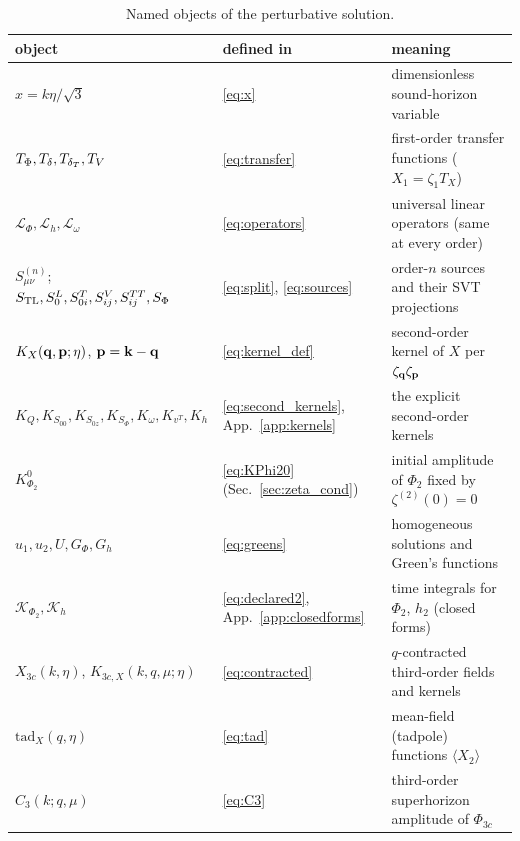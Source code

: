 \begin{table}[t]
\centering\small
\begin{tabular}{@{}p{}p{}p{}@{}}
\hline
object & defined in & meaning\\ \hline
$x=k\eta/\sqrt3$ & \eqref{eq:x} & dimensionless sound-horizon variable\\
$T_\Phi,T_\delta,T_{\delta_T},T_V$ & \eqref{eq:transfer} & first-order transfer functions ($X_1=\zeta_1T_X$)\\
$\mathcal L_\Phi,\mathcal L_h,\mathcal L_\omega$ & \eqref{eq:operators} & universal linear operators (same at every order)\\
$S^{(n)}_{\mu\nu}$; $S_{\rm TL},S_{0}^{L},S^{T}_{0i},S^{V}_{ij},S^{TT}_{ij},S_\Phi$ & \eqref{eq:split}, \eqref{eq:sources} & order-$n$ sources and their SVT projections\\
$K_X(\mathbf q,\mathbf p;\eta)$, $\mathbf p=\mathbf k-\mathbf q$ & \eqref{eq:kernel_def} & second-order kernel of $X$ per $\zeta_{\mathbf q}\zeta_{\mathbf p}$\\
$K_Q,K_{S_{00}},K_{S_{0z}},K_{S_\Phi},K_\omega,K_{v^T},K_h$ & \eqref{eq:second_kernels}, App.~\ref{app:kernels} & the explicit second-order kernels\\
$K^0_{\Phi_2}$ & \eqref{eq:KPhi20} (Sec.~\ref{sec:zeta_cond}) & initial amplitude of $\Phi_2$ fixed by $\zeta^{(2)}(0)=0$\\
$u_1,u_2,U,G_\Phi,G_h$ & \eqref{eq:greens} & homogeneous solutions and Green's functions\\
$\mathcal K_{\Phi_2},\mathcal K_h$ & \eqref{eq:declared2}, App.~\ref{app:closedforms} & time integrals for $\Phi_2$, $h_2$ (closed forms)\\
$X_{3c}(k,\eta)$, $K_{3c,X}(k,q,\mu;\eta)$ & \eqref{eq:contracted} & $q$-contracted third-order fields and kernels\\
$\mathrm{tad}_X(q,\eta)$ & \eqref{eq:tad} & mean-field (tadpole) functions $\langle X_2\rangle$\\
$C_3(k;q,\mu)$ & \eqref{eq:C3} & third-order superhorizon amplitude of $\Phi_{3c}$\\
\hline
\end{tabular}
\caption{Named objects of the perturbative solution.}
\label{tab:objects}
\end{table}

